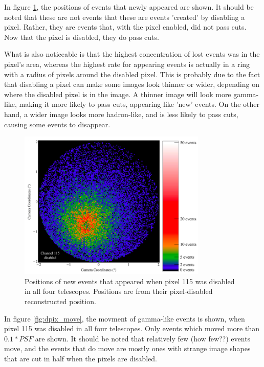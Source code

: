 In figure \ref{fig:dpix_appear}, the positions of events that newly appeared are shown.
It should be noted that these are not events that these are events 'created' by disabling a pixel.
Rather, they are events that, with the pixel enabled, did not pass cuts.
Now that the pixel is disabled, they do pass cuts.

What is also noticeable is that the highest concentration of lost events was in the pixel's area, whereas the highest rate for appearing events is actually in a ring with a radius of  pixels around the disabled pixel.
This is probably due to the fact that disabling a pixel can make some images look thinner or wider, depending on where the disabled pixel is in the image.
A thinner image will look more gamma-like, making it more likely to pass cuts, appearing like 'new' events.
On the other hand, a wider image looks more hadron-like, and is less likely to pass cuts, causing some events to disappear.

\begin{figure}[ht]
  \begin{center}
    \includegraphics[width=0.8\textwidth]{images/disabled_pixel/appearing_events}
    \caption[Newly Appearing Events]{Positions of new events that appeared when pixel 115 was disabled in all four telescopes.  Positions are from their pixel-disabled reconstructed position.}\label{fig:dpix_appear}
  \end{center}
\end{figure}

In figure \ref{fig:dpix_move}, the movment of gamma-like events is shown, when pixel 115 was disabled in all four telescopes.
Only events which moved more than $0.1*PSF$ are shown.
It should be noted that relatively few (how few??) events move, and the events that do move are mostly ones with strange image shapes that are cut in half when the pixels are disabled.


